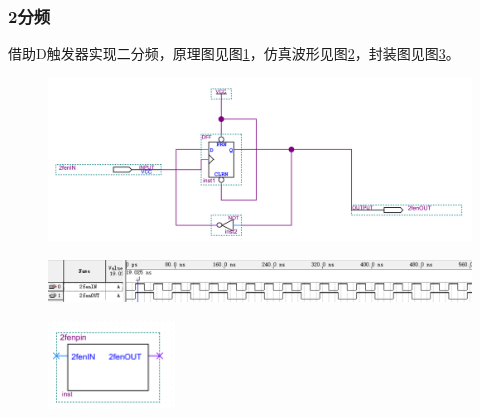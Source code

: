 \documentclass[12pt]{article}
\begin{document}
\subsubsection{2分频}
借助D触发器实现二分频，原理图见图\ref{fig:2fenpin}，仿真波形见图\ref{fig:fangzhen2fenpin}，封装图见图\ref{fig:fengzhuang2fenpin}。
\begin{figure}[hp]
	\centering  
	\includegraphics[width=\textwidth]{picture/2fenpin.png} 
	\caption{}
	\label{fig:2fenpin}   
\end{figure}
\begin{figure}[hp]
	\centering  
	\includegraphics[width=\textwidth]{picture/TIM20181210152648.png} 
	\caption{}
	\label{fig:fangzhen2fenpin}   
\end{figure}
\begin{figure}[hp]
	\centering  
	\includegraphics[width=0.3\textwidth]{picture/fenzhuang2fenp.png} 
	\caption{}
	\label{fig:fengzhuang2fenpin}   
\end{figure}
\end{document}
